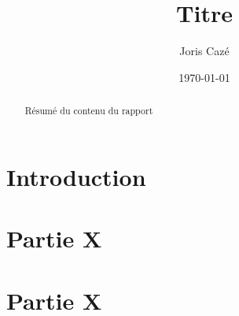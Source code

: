 \documentclass[french]{article}
\title{Titre}
\author{Joris Cazé}
\date{\today}
\begin{document}
\maketitle
\begin{abstract}
	Résumé du contenu du rapport
\end{abstract}

%


%

%

\setcounter{tocdepth}{3} %
\tableofcontents
\listoffigures
\listoftables

\newpage

%

\section{Introduction}


\section{Partie X}


\section{Partie X}


\end{document}
